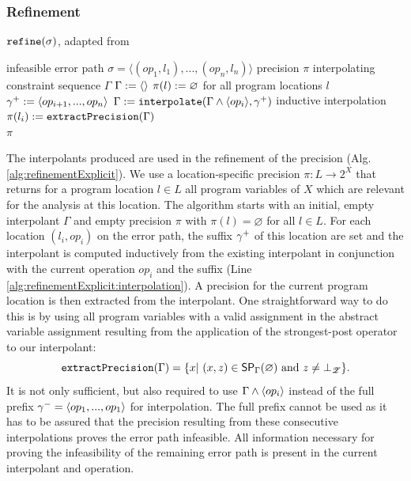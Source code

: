 \subsubsection*{Refinement}
\begin{algorithm}[t]
\caption{$\texttt{refine}(\sigma)$, adapted from \cite{Beyer2015}}
\label{alg:refinementExplicit}
\begin{algorithmic}[1]
\Input infeasible error path $\sigma = \langle (op_1, l_1), ..., (op_n, l_n) \rangle$
\Output precision $\pi$
\Variables interpolating constraint sequence $\Gamma$
\State $\Gamma := \langle \rangle$
\State $\pi(l) := \varnothing$ for all program locations $l$
\label{alg:refinementExplicit:loopStart}
	\State ${\gamma^{+}} := \langle op_{i+1}, ..., op_n \rangle$
	\State $\Gamma := \texttt{interpolate}(\Gamma \wedge \langle op_i \rangle, {\gamma^{+}})$ \Comment inductive interpolation \label{alg:refinementExplicit:interpolation}
	\State $\pi(l_i) := \texttt{extractPrecision}(\Gamma)$
\EndFor\\
\Return $\pi$
\end{algorithmic}
\end{algorithm}

The interpolants produced are used in the refinement of the precision (Alg. \ref{alg:refinementExplicit}).
We use a location-specific precision $\pi : L \rightarrow 2^X$ that returns for a program location $l \in L$ all program variables of $X$ which are relevant for the analysis at this location. 
The algorithm starts with an initial, empty interpolant $\Gamma$ and empty precision $\pi$ with $\pi(l) = \varnothing$ for all $l \in L$.
For each location $(l_i, op_i)$ on the error path, the suffix ${\gamma^{+}}$ of this location are set and the interpolant is computed inductively from the existing interpolant in conjunction with the current operation $op_i$ and the suffix (Line \ref{alg:refinementExplicit:interpolation}).
A precision for the current program location is then extracted from the interpolant.
One straightforward way to do this is by using all program variables with a valid assignment in the  abstract variable assignment resulting from the application of the strongest-post operator to our interpolant:
\[\texttt{extractPrecision}(\Gamma) = \{ x |\ (x, z) \in \operatorname{\operatorname{\operatorname{\mathsf{SP}}}}_\Gamma (\varnothing ) \text{ and } z \neq \bot_{\mathscr{Z}} \}.\]
It is not only sufficient, but also required to use $\Gamma \wedge \langle op_i \rangle$ instead of the full prefix ${\gamma^{-}} = \langle op_1, ..., op_1 \rangle$ for interpolation. The full prefix cannot be used as it has to be assured that the precision resulting from these consecutive interpolations proves the error path infeasible. All information necessary for proving the infeasibility of the remaining error path is present in the current interpolant and operation.

